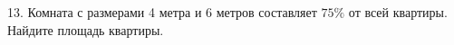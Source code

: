 13. Комната с размерами 4 метра и 6 метров составляет $75\%$ от всей квартиры. Найдите площадь квартиры.\\
